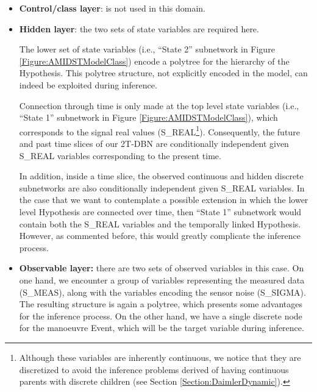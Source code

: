 \begin{itemize}

\item \textbf{Control/class layer}: is not used in this domain.

\item \textbf{Hidden layer}: the two sets of state variables are required here. 

The lower set of state variables (i.e., ``State 2'' subnetwork in Figure \ref{Figure:AMIDSTModelClass}) encode a polytree \cite{JensenNielsen2007} for the hierarchy of the Hypothesis. This polytree structure, not explicitly encoded in the model, can indeed be exploited during inference.

Connection through time is only made at the top level state variables (i.e., ``State 1'' subnetwork in Figure \ref{Figure:AMIDSTModelClass}), which corresponds to the signal real values (S\_REAL\footnote{Although these variables are inherently continuous, we notice that they are discretized to avoid the inference problems derived of having continuous parents with discrete children (see Section \ref{Section:DaimlerDynamic}).}). Consequently, the future and past time slices of our 2T-DBN are conditionally independent given S\_REAL variables corresponding to the present time. 

In addition, inside a time slice, the observed continuous and hidden discrete subnetworks are also conditionally independent given S\_REAL variables. In the case that we want to contemplate a possible extension in which the lower level Hypothesis are connected over time, then ``State 1'' subnetwork would contain both the S\_REAL variables and the temporally linked Hypothesis. However, as commented before, this would greatly complicate the inference process. 

\item \textbf{Observable layer:} there are two sets of observed variables in this case. On one hand, we encounter a group of variables representing the measured data (S\_MEAS), along with the variables encoding the sensor noise (S\_SIGMA). The resulting structure is again a polytree, which presents some advantages for the inference process. On the other hand, we have a single discrete node for the manoeuvre Event, which will be the target variable during inference. 

\end{itemize}

